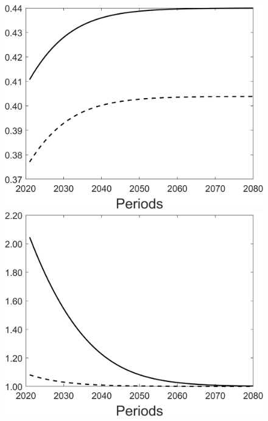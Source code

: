 \begin{figure}[h!!]
\begin{minipage}[]{0.32\textwidth}
	\end{minipage}
	\begin{minipage}[]{0.32\textwidth}
		\includegraphics[width=1\textwidth]{../../codding_model/Own/figures/Rep_agent/staticBAU_LF_separate_hl_periods59_eppsilon4.00_zeta1.40_Ad08_Ac04_thetac0.70_thetad0.56_HetGrowth1_tauul0.181_util0_withtarget0_lgd0.png}
	\end{minipage}
\begin{minipage}[]{0.32\textwidth}
\includegraphics[width=1\textwidth]{../../codding_model/Own/figures/Rep_agent/staticBAU_LF_separate_pd_periods59_eppsilon4.00_zeta1.40_Ad08_Ac04_thetac0.70_thetad0.56_HetGrowth1_tauul0.181_util0_withtarget0_lgd0.png}

\end{minipage}
\end{figure}

